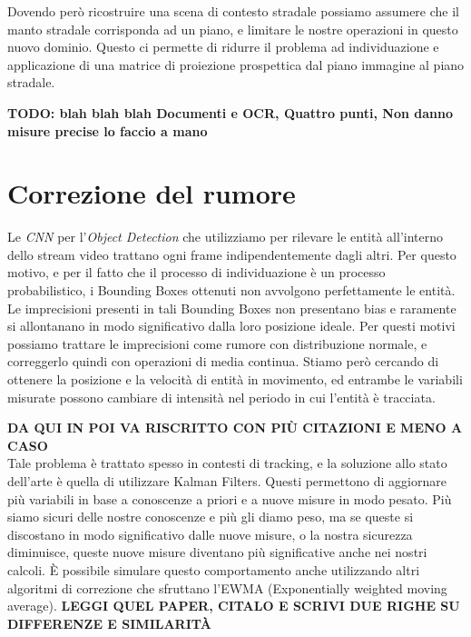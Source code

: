 Dovendo però ricostruire una scena di contesto stradale possiamo assumere che il manto stradale corrisponda ad un piano, e limitare le nostre operazioni in questo nuovo dominio.
Questo ci permette di ridurre il problema ad individuazione e applicazione di una matrice di proiezione prospettica dal piano immagine al piano stradale.

\textbf{TODO: blah blah blah Documenti e OCR, Quattro punti, Non danno misure precise lo faccio a mano}


\section{Correzione del rumore}
Le \emph{CNN} per l'\emph{Object Detection} che utilizziamo per rilevare le entità all'interno dello stream video trattano ogni frame indipendentemente dagli altri.
Per questo motivo, e per il fatto che il processo di individuazione è un processo probabilistico, i Bounding Boxes ottenuti non avvolgono perfettamente le entità.
Le imprecisioni presenti in tali Bounding Boxes non presentano bias e raramente si allontanano in modo significativo dalla loro posizione ideale.
Per questi motivi possiamo trattare le imprecisioni come rumore con distribuzione normale, e correggerlo quindi con operazioni di media continua.
Stiamo però cercando di ottenere la posizione e la velocità di entità in movimento, ed entrambe le variabili misurate possono cambiare di intensità nel periodo in cui l'entità è tracciata.

\textbf{DA QUI IN POI VA RISCRITTO CON PIÙ CITAZIONI E MENO A CASO} \\
Tale problema è trattato spesso in contesti di tracking, e la soluzione allo stato dell'arte è quella di utilizzare Kalman Filters.
Questi permettono di aggiornare più variabili in base a conoscenze a priori e a nuove misure in modo pesato.
Più siamo sicuri delle nostre conoscenze e più gli diamo peso, ma se queste si discostano in modo significativo dalle nuove misure, o la nostra sicurezza diminuisce, queste nuove misure diventano più significative anche nei nostri calcoli.
È possibile simulare questo comportamento anche utilizzando altri algoritmi di correzione che sfruttano l'EWMA (Exponentially weighted moving average).
\textbf{LEGGI QUEL PAPER, CITALO E SCRIVI DUE RIGHE SU DIFFERENZE E SIMILARITÀ}
